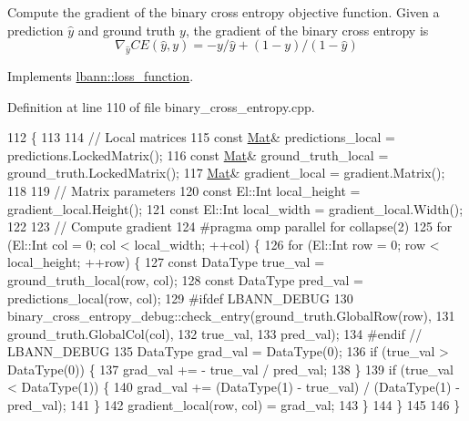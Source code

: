Compute the gradient of the binary cross entropy objective function. Given a prediction $\hat{y}$ and ground truth $y$, the gradient of the binary cross entropy is \[ \nabla_{\hat{y}} CE(\hat{y}, y) = -y/\hat{y} + (1-y)/(1-\hat{y}) \] 

Implements \hyperlink{classlbann_1_1loss__function_aefccc2b4f5a02664002d12630cf369e7}{lbann\+::loss\+\_\+function}.



Definition at line 110 of file binary\+\_\+cross\+\_\+entropy.\+cpp.


\begin{DoxyCode}
112                                                                        \{
113 
114   \textcolor{comment}{// Local matrices}
115   \textcolor{keyword}{const} \hyperlink{base_8hpp_a68f11fdc31b62516cb310831bbe54d73}{Mat}& predictions\_local = predictions.LockedMatrix();
116   \textcolor{keyword}{const} \hyperlink{base_8hpp_a68f11fdc31b62516cb310831bbe54d73}{Mat}& ground\_truth\_local = ground\_truth.LockedMatrix();
117   \hyperlink{base_8hpp_a68f11fdc31b62516cb310831bbe54d73}{Mat}& gradient\_local = gradient.Matrix();
118 
119   \textcolor{comment}{// Matrix parameters}
120   \textcolor{keyword}{const} El::Int local\_height = gradient\_local.Height();
121   \textcolor{keyword}{const} El::Int local\_width = gradient\_local.Width();
122 
123   \textcolor{comment}{// Compute gradient}
124 \textcolor{preprocessor}{  #pragma omp parallel for collapse(2)}
125   \textcolor{keywordflow}{for} (El::Int col = 0; col < local\_width; ++col) \{
126     \textcolor{keywordflow}{for} (El::Int row = 0; row < local\_height; ++row) \{
127       \textcolor{keyword}{const} DataType true\_val = ground\_truth\_local(row, col);
128       \textcolor{keyword}{const} DataType pred\_val = predictions\_local(row, col);
129 \textcolor{preprocessor}{      #ifdef LBANN\_DEBUG}
130       binary\_cross\_entropy\_debug::check\_entry(ground\_truth.GlobalRow(row),
131                                               ground\_truth.GlobalCol(col),
132                                               true\_val,
133                                               pred\_val);
134 \textcolor{preprocessor}{      #endif // LBANN\_DEBUG}
135       DataType grad\_val = DataType(0);
136       \textcolor{keywordflow}{if} (true\_val > DataType(0)) \{
137         grad\_val += - true\_val / pred\_val;
138       \}
139       \textcolor{keywordflow}{if} (true\_val < DataType(1)) \{
140         grad\_val += (DataType(1) - true\_val) / (DataType(1) - pred\_val);
141       \}
142       gradient\_local(row, col) = grad\_val;
143     \}
144   \}
145 
146 \}
\end{DoxyCode}

